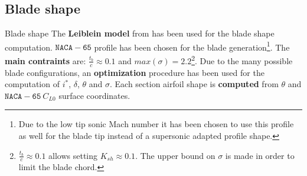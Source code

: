 \subsection{Blade shape}
	{\nologo
	\begin{frame}{Blade shape}
		The \textbf{Leiblein model} from \cite[Ch. 6]{axial2004} has been used for the blade shape computation. 
		\newline 
		\newline
		$\mathtt{NACA-65}$ profile has been chosen for the blade generation\footnote{Due to the low tip sonic Mach number it has been chosen to use this profile as well for the blade tip instead of a supersonic adapted profile shape.}.
		\newline
		\newline
		The \textbf{main contraints} are: $\frac{t_b}{c} \approx 0.1$ and $max(\sigma) = 2.2$\footnote{$\frac{t_b}{c} \approx 0.1$ allows setting $K_{sh} \approx 0.1$. The upper bound on $\sigma$ is made in order to limit the blade chord.}.
		\newline
		\newline
		Due to the many possible blade configurations, an \textbf{optimization} procedure has been used for the computation of $i^{*}$, $\delta$, $\theta$ and $\sigma$. 
		\newline
		\newline
		Each section airfoil shape is \textbf{computed} from $\theta$ and $\mathtt{NACA-65} \ C_{L0}$ surface coordinates.
	\end{frame}
	}
